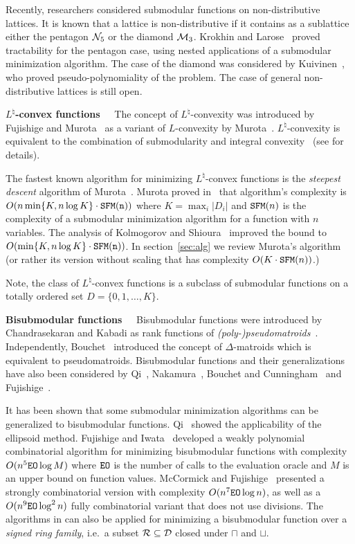 \documentclass[11pt,onecolumn]{article}
\newcommand{\myparagraph}[1]{{\vspace*{2pt}\noindent\bf{#1}~~}}
\def\D{{\cal D}}
\def\calR{{\cal R}}
\begin{document}
Recently, researchers considered submodular functions on non-distributive lattices.
It is known that a lattice is non-distributive if it contains as a sublattice either the pentagon ${\cal N}_5$
or the diamond ${\cal M}_3$.
Krokhin and Larose~\cite{KrokhinLarose:08} proved tractability for the pentagon case, using nested applications of a submodular minimization algorithm.
The case of the diamond was considered by Kuivinen~\cite{Kuivinen:TR}, who proved pseudo-polynomiality of the problem.
The case of general non-distributive lattices is still open.

\myparagraph{$L^\natural$-convex functions}
The concept of $L^\natural$-convexity was introduced by Fujishige and Murota~\cite{FujishigeMurota:00} as a variant of $L$-convexity by Murota~\cite{Murota:98}. $L^\natural$-convexity is equivalent to the combination of submodularity and integral 
convexity~\cite{FavatiTardella:90} (see \cite{Murota:book} for details).

The fastest known algorithm for minimizing $L^\natural$-convex functions is the {\em steepest descent} algorithm
of Murota~\cite{Murota:IEICE00,Murota:book,Murota:SIAM03}. 
Murota proved in~\cite{Murota:SIAM03} that algorithm's complexity is $O(n\min\{K,n\log K\}\cdot {\tt SFM(n)})$
where $K=\max_i |D_i|$ and ${\tt SFM}(n)$ is the complexity of a submodular minimization algorithm for a function with $n$ variables.
The analysis of Kolmogorov and Shioura~\cite{KS:09} improved the bound to $O(\min\{K,n\log K\}\cdot {\tt SFM(n)})$.
In section~\ref{sec:alg} we review Murota's algorithm (or rather its version without scaling that has complexity $O(K\cdot {\tt SFM}(n))$.)

Note, the class of $L^\natural$-convex functions is a subclass of submodular functions on a totally ordered set $D=\{0,1,\ldots,K\}$.

\myparagraph{Bisubmodular functions}
Bisubmodular functions were introduced by Chandrasekaran and Kabadi
as rank functions of {\em (poly-)pseudomatroids}~\cite{Chandrasekaran:88,Kabadi:90}.
Independently, Bouchet~\cite{Bouchet:87} introduced the concept of $\Delta$-matroids which is equivalent
to pseudomatroids.
Bisubmodular functions and their generalizations have also been considered by Qi~\cite{Qi:88},
Nakamura~\cite{Nakamura:88}, Bouchet and Cunningham~\cite{Bouchet:95} and Fujishige~\cite{Fujishige:91}.

It has been shown that some submodular minimization algorithms can be generalized to bisubmodular functions.
Qi~\cite{Qi:88} showed the applicability of the ellipsoid method.
Fujishige and Iwata~\cite{Fujishige:06} developed a weakly polynomial combinatorial algorithm for minimizing bisubmodular functions with
complexity $O(n^5 {\tt EO} \log M)$ where ${\tt EO}$ is the number of calls to the evaluation oracle and $M$ is an upper bound on function values.
McCormick and Fujishige~\cite{McCormick:10} presented a strongly combinatorial version with
complexity $O(n^7 {\tt EO} \log n)$, as well as a $O(n^9 {\tt EO} \log^2 n)$ fully combinatorial variant that does not use divisions.
The algorithms in \cite{McCormick:10} can also be applied for minimizing a bisubmodular
function over a {\em signed ring family}, i.e.\ a subset $\calR\subseteq \D$ closed under $\sqcap$ and $\sqcup$.
\end{document}
